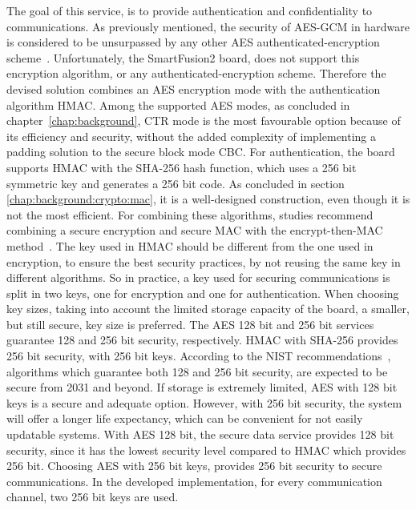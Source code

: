 The goal of this service, is to provide authentication and confidentiality to communications.
As previously mentioned, the security of \ac{AES}-\ac{GCM} in hardware is considered to be unsurpassed by any other \ac{AES} authenticated-encryption scheme~\cite{aesmodes}.
Unfortunately, the SmartFusion2 board, does not support this encryption algorithm, or any authenticated-encryption scheme.
Therefore the devised solution combines an \ac{AES} encryption mode with the authentication algorithm \ac{HMAC}. Among the supported \ac{AES} modes, as concluded in chapter~\ref{chap:background}, CTR mode is the most favourable option because of its efficiency and security, without the added complexity of implementing a padding solution to the secure block mode \ac{CBC}.
For authentication, the board supports \ac{HMAC} with the \ac{SHA}-256 hash function, which uses a 256 bit symmetric key and generates a 256 bit code. As concluded in section \ref{chap:background:crypto:mac}, it is a well-designed construction, even though it is not the most efficient.
For combining these algorithms, studies recommend combining a secure encryption and secure \ac{MAC} with the encrypt-then-MAC method~\cite{encryptmacorder}.
The key used in HMAC should be different from the one used in encryption, to ensure the best security practices, by not reusing the same key in different algorithms. So in practice, a key used for securing communications is split in two keys, one for encryption and one for authentication.
When choosing key sizes, taking into account the limited storage capacity of the board, a smaller, but still secure, key size is preferred. The \ac{AES} 128 bit and 256 bit services guarantee 128 and 256 bit security, respectively. HMAC with SHA-256 provides 256 bit security, with 256 bit keys. According to the \ac{NIST} recommendations~\cite{nistRecommendations}, algorithms which guarantee both 128 and 256 bit security, are expected to be secure from 2031 and beyond. If storage is extremely limited, AES with 128 bit keys is a secure and adequate option. However, with 256 bit security, the system will offer a longer life expectancy, which can be convenient for not easily updatable systems.
With AES 128 bit, the secure data service provides 128 bit security, since it has the lowest security level compared to HMAC which provides 256 bit. Choosing AES with 256 bit keys, provides 256 bit security to secure communications.
In the developed implementation, for every communication channel, two 256 bit keys are used.

